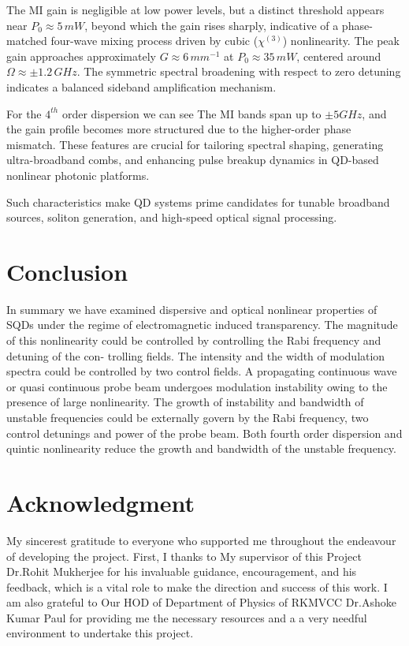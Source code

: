 \documentclass[12pt,a4paper]{article}
\begin{document}
The MI gain is negligible at low power levels, but a distinct threshold appears near \( P_0 \approx 5 \, {mW} \), beyond which the gain rises sharply, indicative of a phase-matched four-wave mixing process driven by cubic (\( \chi^{(3)} \)) nonlinearity. The peak gain approaches approximately \( G \approx 6 \, {mm^{-1}} \) at \( P_0 \approx 35 \, {mW} \), centered around \( \Omega \approx \pm 1.2 \, {GHz} \). The symmetric spectral broadening with respect to zero detuning indicates a balanced sideband amplification mechanism.

For the \(4^{th}\) order dispersion we can see The MI bands span up to $\pm5GHz$, and the gain profile becomes more structured due to the higher-order phase mismatch. These features are crucial for tailoring spectral shaping, generating ultra-broadband combs, and enhancing pulse breakup dynamics in QD-based nonlinear photonic platforms.

Such characteristics make QD systems prime candidates for tunable broadband sources, soliton generation, and high-speed optical signal processing.

\section{Conclusion}
In summary we have examined dispersive and optical nonlinear properties of SQDs under the regime of electromagnetic induced transparency. The magnitude of this nonlinearity could be controlled by controlling the Rabi frequency and detuning of the con- trolling fields. The intensity and the width of modulation spectra could be controlled by two control fields. A propagating continuous wave or quasi continuous probe beam undergoes modulation instability \cite{lighthall} owing to the presence of large nonlinearity. The growth of instability and bandwidth of unstable frequencies could be externally govern by the Rabi frequency, two control detunings and power of the probe beam. Both fourth order dispersion and quintic nonlinearity reduce the growth and bandwidth of the unstable frequency.

\newpage
\section*{Acknowledgment}
My sincerest gratitude to everyone who supported me throughout the endeavour of developing the project. First, I thanks to My supervisor of this Project Dr.Rohit Mukherjee for his invaluable guidance, encouragement, and his feedback, which is a vital role to make the direction and success of this work. I am also grateful to Our HOD of Department of Physics of RKMVCC Dr.Ashoke Kumar Paul for providing me the necessary resources and a a very needful environment to undertake this project.

\newpage


\end{document}
